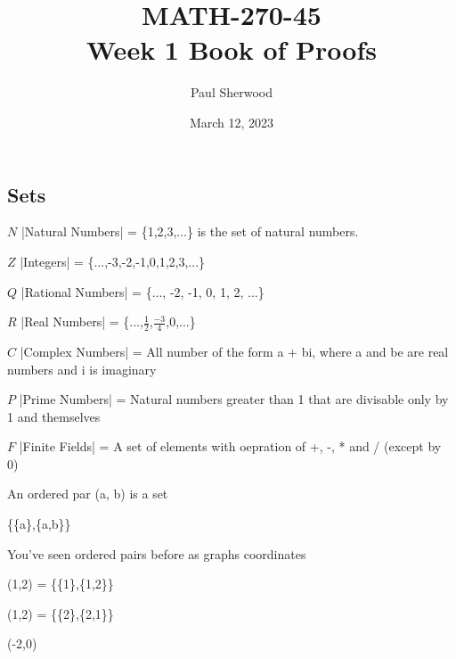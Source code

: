 \documentclass{report}
\title{\Huge{MATH-270-45}\\Week 1 Book of Proofs}
\author{\huge{Paul Sherwood}}
\date{March 12, 2023}
\begin{document}
\maketitle
\newpage%
{}
\tableofcontents
\pagebreak

\chapter{}
\section{Sets}


{ 
$N$ |Natural Numbers| = \{1,2,3,...\} is the set of natural numbers.

$Z$ |Integers| = \{...,-3,-2,-1,0,1,2,3,...\}

$Q$ |Rational Numbers| = \{..., -2, -1, 0, 1, 2, ...\}

$R$ |Real Numbers| = \{...,$\frac{1}{2}$,$\frac{-3}{4}$,0,...\}

$C$ |Complex Numbers| = All number of the form a + bi, where a and be are real numbers and i is imaginary

$P$ |Prime Numbers| = Natural numbers greater than 1 that are divisable only by 1 and themselves

$F$ |Finite Fields| = A set of elements with oepration of +, -, * and / (except by 0)

}

{
An ordered par (a, b) is a set

\{\{a\},\{a,b\}\}

You've seen ordered pairs before as graphs coordinates

(1,2) = \{\{1\},\{1,2\}\}

(1,2) = \{\{2\},\{2,1\}\}

(-2,0)

}

\end{document}
